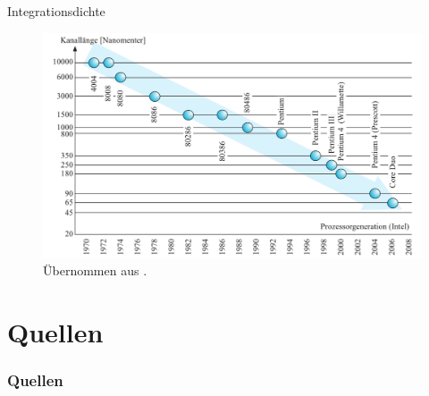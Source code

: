 \documentclass[12pt%
,aspectratio=169%
]{beamer}
\begin{document}
\begin{frame}{Integrationsdichte}
\begin{figure}
\center
\includegraphics[scale=0.35]{pictures/integrationsdichte}
\caption{Übernommen aus \cite{hoffmann2020grundlagen}.}
\end{figure}
\end{frame}


\section*{Quellen}
\appendix
\begin{frame}[allowframebreaks]
  \frametitle<presentation>{Quellen}
\printbibliography
\end{frame}
\end{document}
